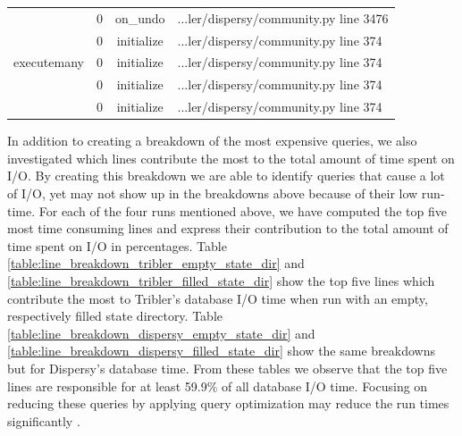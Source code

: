 \begin{table}[!h]
{\begin{tabular}{|c|c|c|l|}
		\multicolumn{1}{|c|}{\multirow{5}{*}{executemany}} & \multicolumn{1}{c|}{0} & \multicolumn{1}{c|}{on\_undo} & \multicolumn{1}{l|}{...ler/dispersy/community.py line 3476} \\ \cline{2-4}
		\multicolumn{1}{|c|}{} & \multicolumn{1}{c|}{0}  & \multicolumn{1}{c|}{initialize}  & \multicolumn{1}{l|}{...ler/dispersy/community.py line 374}  \\ \cline{2-4} 
		\multicolumn{1}{|c|}{} & \multicolumn{1}{c|}{0}  & \multicolumn{1}{c|}{initialize}  & \multicolumn{1}{l|}{...ler/dispersy/community.py line 374}  \\ \cline{2-4} 
		\multicolumn{1}{|c|}{} & \multicolumn{1}{c|}{0}  & \multicolumn{1}{c|}{initialize}  & \multicolumn{1}{l|}{...ler/dispersy/community.py line 374}  \\ \cline{2-4} 
		\multicolumn{1}{|c|}{} & \multicolumn{1}{c|}{0}  & \multicolumn{1}{c|}{initialize}  & \multicolumn{1}{l|}{...ler/dispersy/community.py line 374}  \\ \hline 
	\end{tabular}}
\end{table}

In addition to creating a breakdown of the most expensive queries, we also investigated which lines contribute the most to the total amount of time spent on I/O.
By creating this breakdown we are able to identify queries that cause a lot of I/O, yet may not show up in the breakdowns above because of their low run-time.
For each of the four runs mentioned above, we have computed the top five most time consuming lines and express their contribution to the total amount of time spent on I/O in percentages.
Table \ref{table:line_breakdown_tribler_empty_state_dir} and \ref{table:line_breakdown_tribler_filled_state_dir} show the top five lines which contribute the most to Tribler's database I/O time when run with an empty, respectively filled state directory.
Table \ref{table:line_breakdown_dispersy_empty_state_dir} and \ref{table:line_breakdown_dispersy_filled_state_dir} show the same breakdowns but for Dispersy's database time.
From these tables we observe that the top five lines are responsible for at least 59.9\% of all database I/O time.
Focusing on reducing these queries by applying query optimization may reduce the run times significantly \cite{jarke1984query}.

